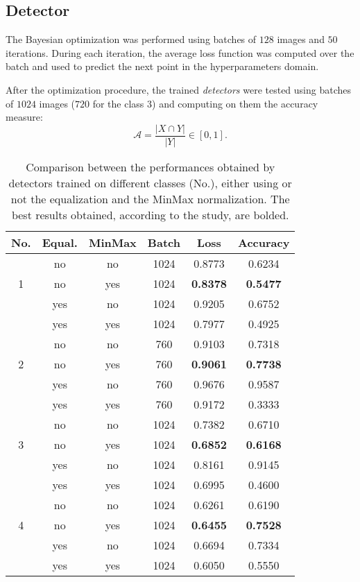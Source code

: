 \subsection{Detector}\label{section:results:detector}
\par{
	The Bayesian optimization was performed using batches of $128$ images and $50$ iterations. During each iteration, the average loss function was computed over the batch and used to predict the next point in the hyperparameters domain. 
}
\par{
	After the optimization procedure, the trained \emph{detectors} were tested using batches of $1024$ images ($720$ for the class $3$) and computing on them the accuracy measure:
	\begin{equation*}
	\mathcal{A} = \frac{\lvert X \cap Y \rvert}{\lvert Y \rvert} \in \left[0,1\right].
	\end{equation*}
}
\begin{table}
	\centering
	\normalsize	
	\begin{tabular}{|c|c|c|c|c|c|}
		\hline		
		\textbf{No.} & \textbf{Equal.} & \textbf{MinMax} & \textbf{Batch} & \textbf{Loss} & \textbf{Accuracy}\\ \hline
		\multirow{3}{*}{1} & no & no & 1024 & 0.8773 & 0.6234 \\
		& no & yes & 1024 & \textbf{0.8378} & \textbf{0.5477} \\
		& yes & no & 1024 & 0.9205 & 0.6752 \\
		& yes & yes & 1024 & 0.7977 & 0.4925 \\ \hline
		\multirow{3}{*}{2} & no & no & 760 & 0.9103 & 0.7318\\
		& no & yes & 760 & \textbf{0.9061} & \textbf{0.7738} \\
		& yes & no & 760 & 0.9676 & 0.9587 \\
		& yes & yes & 760 & 0.9172 & 0.3333 \\ \hline
		\multirow{3}{*}{3} & no & no & 1024 & 0.7382 & 0.6710 \\
		& no & yes & 1024 & \textbf{0.6852} & \textbf{0.6168} \\
		& yes & no & 1024 & 0.8161 & 0.9145 \\
		& yes & yes & 1024 & 0.6995 & 0.4600 \\ \hline
		\multirow{3}{*}{4} & no & no & 1024 & 0.6261 & 0.6190 \\
		& no & yes & 1024 & \textbf{0.6455} & \textbf{0.7528} \\
		& yes & no & 1024 & 0.6694 & 0.7334 \\
		& yes & yes & 1024 & 0.6050 & 0.5550 \\ \hline
	\end{tabular}
	\vspace{0.25cm}
	\caption{Comparison between the performances obtained by detectors trained on different classes (No.), either using or not the equalization and the MinMax normalization. The best results obtained, according to the study, are bolded.}\label{table:test-bayesopt}
\end{table}
